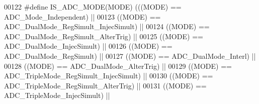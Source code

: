 \begin{DoxyCode}
00122 \textcolor{preprocessor}{#}\textcolor{preprocessor}{define} \textcolor{preprocessor}{IS\_ADC\_MODE}\textcolor{preprocessor}{(}\textcolor{preprocessor}{MODE}\textcolor{preprocessor}{)} \textcolor{preprocessor}{(}\textcolor{preprocessor}{(}\textcolor{preprocessor}{(}\textcolor{preprocessor}{MODE}\textcolor{preprocessor}{)} \textcolor{preprocessor}{==} ADC_Mode_Independent\textcolor{preprocessor}{)} \textcolor{preprocessor}{||}
00123                            \textcolor{preprocessor}{(}\textcolor{preprocessor}{(}\textcolor{preprocessor}{MODE}\textcolor{preprocessor}{)} \textcolor{preprocessor}{==} ADC_DualMode_RegSimult_InjecSimult\textcolor{preprocessor}{)} \textcolor{preprocessor}{||}
00124                            \textcolor{preprocessor}{(}\textcolor{preprocessor}{(}\textcolor{preprocessor}{MODE}\textcolor{preprocessor}{)} \textcolor{preprocessor}{==} ADC_DualMode_RegSimult_AlterTrig\textcolor{preprocessor}{)} \textcolor{preprocessor}{||}
00125                            \textcolor{preprocessor}{(}\textcolor{preprocessor}{(}\textcolor{preprocessor}{MODE}\textcolor{preprocessor}{)} \textcolor{preprocessor}{==} ADC_DualMode_InjecSimult\textcolor{preprocessor}{)} \textcolor{preprocessor}{||}
00126                            \textcolor{preprocessor}{(}\textcolor{preprocessor}{(}\textcolor{preprocessor}{MODE}\textcolor{preprocessor}{)} \textcolor{preprocessor}{==} ADC_DualMode_RegSimult\textcolor{preprocessor}{)} \textcolor{preprocessor}{||}
00127                            \textcolor{preprocessor}{(}\textcolor{preprocessor}{(}\textcolor{preprocessor}{MODE}\textcolor{preprocessor}{)} \textcolor{preprocessor}{==} ADC_DualMode_Interl\textcolor{preprocessor}{)} \textcolor{preprocessor}{||}
00128                            \textcolor{preprocessor}{(}\textcolor{preprocessor}{(}\textcolor{preprocessor}{MODE}\textcolor{preprocessor}{)} \textcolor{preprocessor}{==} ADC_DualMode_AlterTrig\textcolor{preprocessor}{)} \textcolor{preprocessor}{||}
00129                            \textcolor{preprocessor}{(}\textcolor{preprocessor}{(}\textcolor{preprocessor}{MODE}\textcolor{preprocessor}{)} \textcolor{preprocessor}{==} ADC_TripleMode_RegSimult_InjecSimult\textcolor{preprocessor}{)} \textcolor{preprocessor}{||}
00130                            \textcolor{preprocessor}{(}\textcolor{preprocessor}{(}\textcolor{preprocessor}{MODE}\textcolor{preprocessor}{)} \textcolor{preprocessor}{==} ADC_TripleMode_RegSimult_AlterTrig\textcolor{preprocessor}{)} \textcolor{preprocessor}{||}
00131                            \textcolor{preprocessor}{(}\textcolor{preprocessor}{(}\textcolor{preprocessor}{MODE}\textcolor{preprocessor}{)} \textcolor{preprocessor}{==} ADC_TripleMode_InjecSimult\textcolor{preprocessor}{)} \textcolor{preprocessor}{||}

\end{DoxyCode}
